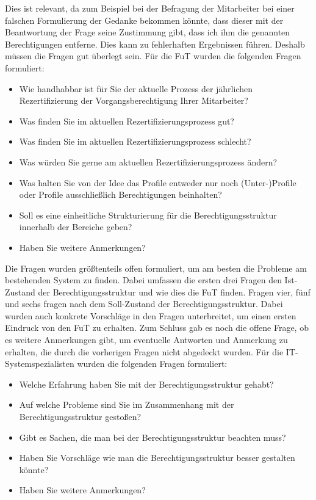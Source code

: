 \newline
Dies ist relevant, da zum Beispiel bei der Befragung der Mitarbeiter bei einer falschen Formulierung der Gedanke bekommen könnte, dass dieser mit der Beantwortung der Frage seine Zustimmung gibt, dass ich ihm die genannten Berechtigungen entferne.
Dies kann zu fehlerhaften Ergebnissen führen.
Deshalb müssen die Fragen gut überlegt sein.
\newline
\newline
Für die \ac{FuT} wurden die folgenden Fragen formuliert: 
\begin{itemize}
	\item Wie handhabbar ist für Sie der aktuelle Prozess der jährlichen Rezertifizierung der Vorgangsberechtigung Ihrer Mitarbeiter?
	\item Was finden Sie im aktuellen Rezertifizierungsprozess gut?
	\item Was finden Sie im aktuellen Rezertifizierungsprozess schlecht?
	\item Was würden Sie gerne am aktuellen Rezertifizierungsprozess ändern?
	\item Was halten Sie von der Idee das Profile entweder nur noch (Unter-)Profile oder Profile ausschließlich Berechtigungen beinhalten?
	\item Soll es eine einheitliche Strukturierung für die Berechtigungsstruktur innerhalb der Bereiche geben?
	\item Haben Sie weitere Anmerkungen?
\end{itemize}
Die Fragen wurden größtenteils offen formuliert, um am besten die Probleme am bestehenden System zu finden.
Dabei umfassen die ersten drei Fragen den Ist-Zustand der Berechtigungsstruktur und wie dies die \ac{FuT} finden.
Fragen vier, fünf und sechs fragen nach dem Soll-Zustand der Berechtigungsstruktur.
Dabei wurden auch konkrete Vorschläge in den Fragen unterbreitet, um einen ersten Eindruck von den \ac{FuT} zu erhalten.
Zum Schluss gab es noch die offene Frage, ob es weitere Anmerkungen gibt, um eventuelle Antworten und Anmerkung zu erhalten, die durch die vorherigen Fragen nicht abgedeckt wurden.
\newline
\newline
Für die IT-Systemspezialisten wurden die folgenden Fragen formuliert: 
\begin{itemize}
	\item Welche Erfahrung haben Sie mit der Berechtigungsstruktur gehabt?
	\item Auf welche Probleme sind Sie im Zusammenhang mit der Berechtigungsstruktur gestoßen?
	\item Gibt es Sachen, die man bei der Berechtigungsstruktur beachten muss?
	\item Haben Sie Vorschläge wie man die Berechtigungsstruktur besser gestalten könnte?
	\item Haben Sie weitere Anmerkungen?
\end{itemize}
